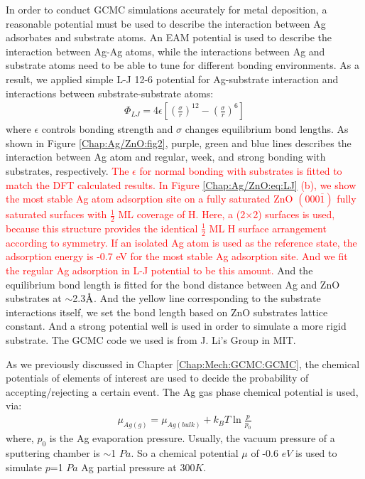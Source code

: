 In order to conduct \ac{GCMC} simulations accurately for metal deposition, a reasonable potential must be used to describe the interaction between Ag adsorbates and substrate atoms. An \ac{EAM} potential \cite{williams2016modeling} is used to describe the interaction between Ag-Ag atoms, while the interactions between Ag and substrate atoms need to be able to tune for different bonding environments. As a result, we applied simple \ac{L-J} 12-6 potential \cite{jones1924determination} for Ag-substrate interaction and interactions between substrate-substrate atoms:
\begin{align}
 \Phi_{LJ} = 4\epsilon \left[ (\frac{\sigma}{r})^{12} - (\frac{\sigma}{r})^6\right]
 \label{Chap:Ag/ZnO:eq:LJ}
\end{align}
where $\epsilon$ controls bonding strength and $\sigma$ changes equilibrium bond lengths. As shown in Figure \ref{Chap:Ag/ZnO:fig2}, purple, green and blue lines describes the interaction between Ag atom and regular, week, and strong bonding with substrates, respectively. \textcolor{red}{The $\epsilon$ for normal bonding with substrates is fitted to match the \ac{DFT} calculated results. In Figure \ref{Chap:Ag/ZnO:eq:LJ} (b), we show the most stable Ag atom adsorption site on a fully saturated ZnO $(000\overline{1})$ fully saturated surfaces with $\frac{1}{2}$ ML coverage of H. Here, a (2$\times$2) surfaces is used, because this structure provides the identical $\frac{1}{2}$ ML H surface arrangement according to symmetry. If an isolated Ag atom is used as the reference state, the adsorption energy is -0.7 eV for the most stable Ag adsorption site. And we fit the regular Ag adsorption in \ac{L-J} potential to be this amount.} And the equilibrium bond length is fitted for the bond distance between Ag and ZnO substrates at $\sim$2.3$\mbox{\normalfont\AA}$. And the yellow line corresponding to the substrate interactions itself, we set the bond length based on ZnO substrates lattice constant. And a strong potential well is used in order to simulate a more rigid substrate. The \ac{GCMC} code we used is from J. Li's Group in MIT\cite{sina2017mapp}.

As we previously discussed in Chapter \ref{Chap:Mech:GCMC:GCMC}, the chemical potentials of elements of interest are used to decide the probability of accepting/rejecting a certain event. The Ag gas phase chemical potential is used, via:
\begin{align}
 \mu_{Ag(g)} = \mu_{Ag(bulk)} + k_{B}T\ln{\frac{p}{p_0}}
 \label{Chap:Ag/ZnO:eq:mu_Ag}
\end{align}
where, $p_0$ is the Ag evaporation pressure. Usually, the vacuum pressure of a sputtering chamber is $\sim$1 $Pa$. So a chemical potential $\mu$ of -0.6 $eV$ is used to simulate $p$=1 $Pa$ Ag partial pressure at 300$K$.



